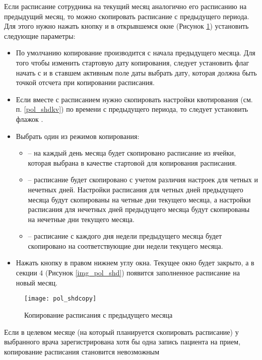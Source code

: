 Если расписание сотрудника на текущий месяц аналогично его расписанию на предыдущий месяц, то можно скопировать расписание с предыдущего периода. Для этого нужно нажать кнопку  и в открывшемся окне (Рисунок \ref{img_pol_shdcopy}) установить следующие параметры:
\begin{itemize}
 \item По умолчанию копирование производится с начала предыдущего месяца. Для того чтобы изменить стартовую дату копирования, следует установить флаг начать с и в ставшем активным поле даты выбрать дату, которая должна быть точкой отсчета при копировании расписания.
 \item Если вместе с расписанием нужно скопировать настройки квотирования (см. п. \ref{pol_shdkv}) по времени с предыдущего периода, то следует установить флажок .
 \item Выбрать один из режимов копирования:
 \begin{itemize}
  \item {} – на каждый день месяца будет скопировано расписание из ячейки, которая выбрана в качестве стартовой для копирования расписания.
  \item {} – расписание будет скопировано с учетом различия настроек для четных и нечетных дней. Настройки расписания для четных дней предыдущего месяца будут скопированы на четные дни текущего месяца, а настройки расписания для нечетных дней предыдущего месяца будут скопированы на нечетные дни текущего месяца.
  \item {} – расписание с каждого дня недели предыдущего месяца будет скопировано на соответствующие дни недели текущего месяца.
 \end{itemize}	
 \item Нажать кнопку   в правом нижнем углу окна. Текущее окно будет закрыто, а в секции 4 (Рисунок \ref{img_pol_shd}) появится заполненное расписание на новый месяц.
\end{itemize}

\begin{figure}[ht]\centering
 \texttt{[image: pol\_shdcopy]}
 \caption{Копирование расписания с предыдущего месяца}
 \label{img_pol_shdcopy}
\end{figure}

\begin{prim}
 Если в целевом месяце (на который планируется скопировать расписание) у выбранного врача зарегистрирована хотя бы одна запись пациента на прием, копирование расписания становится невозможным 
\end{prim}

